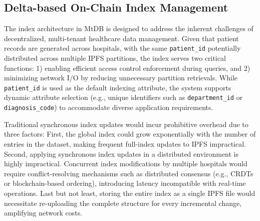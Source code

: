 \documentclass[conference]{IEEEtran}
\newcommand{\wenyi}[1]{ {\color{blue}{#1}}}
\newcommand{\ours}{\xspace MtDB\xspace}
\begin{document}

\subsection{Delta-based On-Chain Index Management} \label{section: index}


The index architecture in \ours is designed to address the inherent challenges of decentralized, multi-tenant healthcare data management. 
Given that patient records are generated across hospitals, with the same \texttt{patient\_id} potentially distributed across multiple IPFS partitions, the index serves two critical functions: 1) enabling efficient access control enforcement during queries, and 2) minimizing network I/O by reducing unnecessary partition retrievals. 
While \texttt{patient\_id} is used as the default indexing attribute, the system supports dynamic attribute selection (e.g., unique identifiers such as \texttt{department\_id} or \texttt{diagnosis\_code}) to accommodate diverse application requirements. 

Traditional synchronous index updates would incur prohibitive overhead due to three factors:
First, the global index could grow exponentially with the number of entries in the dataset, making frequent full-index updates to IPFS impractical.
Second, applying synchronous index updates in a distributed environment is highly impractical.
Concurrent index modifications by multiple hospitals would require conflict-resolving mechanisms such as distributed consensus (e.g., CRDTs or blockchain-based ordering), introducing latency incompatible with real-time operations.
Last but not least, storing the entire index as a single IPFS file would necessitate re-uploading the complete structure for every incremental change, amplifying network costs.


\end{document}
